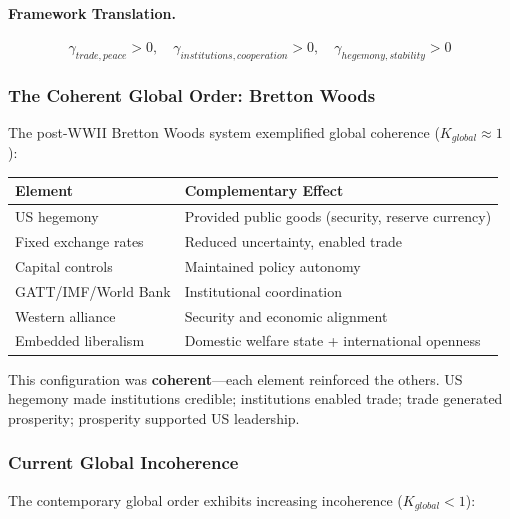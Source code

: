 \paragraph{Framework Translation.}
\begin{equation}
\gamma_{trade,peace} > 0, \quad \gamma_{institutions,cooperation} > 0, \quad
\gamma_{hegemony,stability} > 0
\end{equation}

\subsubsection{The Coherent Global Order: Bretton Woods}

The post-WWII Bretton Woods system exemplified global coherence ($K_{global} \approx 1$):

\begin{center}
\renewcommand{\arraystretch}{1.3}
\begin{tabular}{|l|l|}
\hline
\textbf{Element} & \textbf{Complementary Effect} \\
\hline
US hegemony & Provided public goods (security, reserve currency) \\
Fixed exchange rates & Reduced uncertainty, enabled trade \\
Capital controls & Maintained policy autonomy \\
GATT/IMF/World Bank & Institutional coordination \\
Western alliance & Security and economic alignment \\
Embedded liberalism & Domestic welfare state + international openness \\
\hline
\end{tabular}
\end{center}

This configuration was \textbf{coherent}---each element reinforced the others.
US hegemony made institutions credible; institutions enabled trade; trade
generated prosperity; prosperity supported US leadership.

\subsubsection{Current Global Incoherence}

The contemporary global order exhibits increasing incoherence ($K_{global} < 1$):


